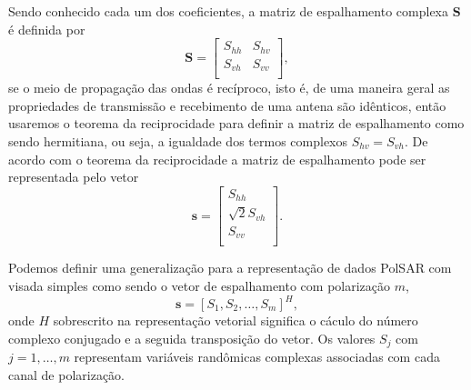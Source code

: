Sendo conhecido cada um dos coeficientes, a matriz de espalhamento complexa $\mathbf{S}$ é definida por
\begin{equation}\label{cap_acf_2}
\mathbf{S} = \left[
\begin{array}{cc}
	S_{hh}   & S_{hv}   \\
	S_{vh}   & S_{vv}   \\
\end{array}
\right],
\end{equation}
se o meio de propagação das ondas é recíproco, isto é, de uma maneira geral as propriedades de transmissão e recebimento de uma antena são idênticos, então usaremos o teorema da reciprocidade \citet{lp} para definir a matriz de espalhamento como sendo hermitiana, ou seja, a igualdade dos termos complexos $S_{hv}=S_{vh}$. De acordo com o teorema da reciprocidade a matriz de espalhamento pode ser representada pelo vetor
\begin{equation}\label{cap_acf_3}
\mathbf{s} = \left[
\begin{array}{c}
	S_{hh}      \\
        \sqrt{2}S_{vh}     \\
	S_{vv}      \\
\end{array}
\right].
\end{equation}

Podemos definir uma generalização para a representação de dados PolSAR com visada simples como sendo o vetor de espalhamento com polarização $m$, $$\mathbf{s}=[S_1,S_2,\dots,S_m]^H,$$ onde $H$ sobrescrito na representação vetorial significa o cáculo do número complexo conjugado e a seguida transposição do vetor. Os valores $S_j$ com $j=1,\dots,m$ representam variáveis randômicas complexas associadas com cada canal de polarização.

